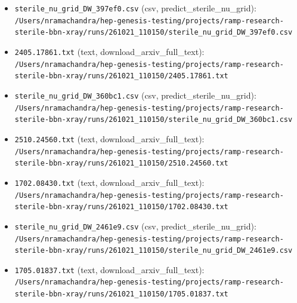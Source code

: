 \documentclass[11pt,a4paper]{article}
\begin{document}
\begin{itemize}
  \item \texttt{sterile\_\allowbreak{}nu\_\allowbreak{}grid\_\allowbreak{}DW\_\allowbreak{}397ef0.csv} (csv, predict\_sterile\_nu\_grid): \texttt{/\allowbreak{}Users/\allowbreak{}nramachandra/\allowbreak{}hep-genesis-testing/\allowbreak{}projects/\allowbreak{}ramp-research-sterile-bbn-xray/\allowbreak{}runs/\allowbreak{}261021\_\allowbreak{}110150/\allowbreak{}sterile\_\allowbreak{}nu\_\allowbreak{}grid\_\allowbreak{}DW\_\allowbreak{}397ef0.csv}
  \item \texttt{2405.17861.txt} (text, download\_arxiv\_full\_text): \texttt{/\allowbreak{}Users/\allowbreak{}nramachandra/\allowbreak{}hep-genesis-testing/\allowbreak{}projects/\allowbreak{}ramp-research-sterile-bbn-xray/\allowbreak{}runs/\allowbreak{}261021\_\allowbreak{}110150/\allowbreak{}2405.17861.txt}
  \item \texttt{sterile\_\allowbreak{}nu\_\allowbreak{}grid\_\allowbreak{}DW\_\allowbreak{}360bc1.csv} (csv, predict\_sterile\_nu\_grid): \texttt{/\allowbreak{}Users/\allowbreak{}nramachandra/\allowbreak{}hep-genesis-testing/\allowbreak{}projects/\allowbreak{}ramp-research-sterile-bbn-xray/\allowbreak{}runs/\allowbreak{}261021\_\allowbreak{}110150/\allowbreak{}sterile\_\allowbreak{}nu\_\allowbreak{}grid\_\allowbreak{}DW\_\allowbreak{}360bc1.csv}
  \item \texttt{2510.24560.txt} (text, download\_arxiv\_full\_text): \texttt{/\allowbreak{}Users/\allowbreak{}nramachandra/\allowbreak{}hep-genesis-testing/\allowbreak{}projects/\allowbreak{}ramp-research-sterile-bbn-xray/\allowbreak{}runs/\allowbreak{}261021\_\allowbreak{}110150/\allowbreak{}2510.24560.txt}
  \item \texttt{1702.08430.txt} (text, download\_arxiv\_full\_text): \texttt{/\allowbreak{}Users/\allowbreak{}nramachandra/\allowbreak{}hep-genesis-testing/\allowbreak{}projects/\allowbreak{}ramp-research-sterile-bbn-xray/\allowbreak{}runs/\allowbreak{}261021\_\allowbreak{}110150/\allowbreak{}1702.08430.txt}
  \item \texttt{sterile\_\allowbreak{}nu\_\allowbreak{}grid\_\allowbreak{}DW\_\allowbreak{}2461e9.csv} (csv, predict\_sterile\_nu\_grid): \texttt{/\allowbreak{}Users/\allowbreak{}nramachandra/\allowbreak{}hep-genesis-testing/\allowbreak{}projects/\allowbreak{}ramp-research-sterile-bbn-xray/\allowbreak{}runs/\allowbreak{}261021\_\allowbreak{}110150/\allowbreak{}sterile\_\allowbreak{}nu\_\allowbreak{}grid\_\allowbreak{}DW\_\allowbreak{}2461e9.csv}
  \item \texttt{1705.01837.txt} (text, download\_arxiv\_full\_text): \texttt{/\allowbreak{}Users/\allowbreak{}nramachandra/\allowbreak{}hep-genesis-testing/\allowbreak{}projects/\allowbreak{}ramp-research-sterile-bbn-xray/\allowbreak{}runs/\allowbreak{}261021\_\allowbreak{}110150/\allowbreak{}1705.01837.txt}

\end{itemize}
\end{document}
